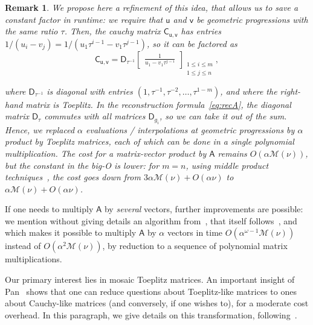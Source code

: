 \documentclass[sigconf]{acmart}
\newcommand{\vu}{\ensuremath{\mathsf{u}}}
\newcommand{\vv}{\ensuremath{\mathsf{v}}}
\newcommand{\mA}{\ensuremath{\mathsf{A}}}
\newcommand{\mC}{\ensuremath{\mathsf{C}}}
\newcommand{\mD}{\ensuremath{\mathsf{D}}}
\newcommand{\M}{\ensuremath{\mathscr{M}}}
\newcommand{\mx}{\ensuremath{\nu}}
\theoremstyle{acmdefinition}
\newtheorem{remark}[theorem]{Remark}
\begin{document}
\vspace{-2mm}

\begin{remark}\label{rmk:factor3}
We propose here a refinement of this idea, that allows us to
save a constant factor in runtime: we require that $\vu$ and $\vv$ be
geometric progressions with {\em the same ratio} $\tau$. Then, the
cauchy matrix $\mC_{\vu,\vv}$ has entries $1/(u_i -
v_j) = 1/(u_1 \tau^{i-1} - v_1 \tau^{j-1})$, so it can be factored as
\vspace{-3px}
$$
\mC_{\vu,\vv}=\mD_{\tau^{-1}}
\begin{bmatrix}
\frac{1}{u_1 - v_1 \tau^{j-i}}
\end{bmatrix}_{\substack{1 \leq i \leq m\\1 \leq j \leq n}},
$$

\vspace{-3px}
\noindent where $\mD_{\tau^{-1}}$ is diagonal with entries
$(1,\tau^{-1},\tau^{-2},\dots,\tau^{1-m})$, and where the right-hand matrix
is Toeplitz. In the reconstruction formula~\eqref{eq:recA}, the
diagonal matrix $\mD_\tau$ commutes with all matrices $\mD_{g_i}$, so
we can take it out of the sum. Hence, we replaced $\alpha$ evaluations
/ interpolations at geometric progressions by $\alpha$ product by
Toeplitz matrices, each of which can be done in a single polynomial
multiplication. The cost for a matrix-vector product by $\mA$ remains
$O(\alpha \M(\mx))$, but the constant in the big-O is lower: for $m=n$,
using middle product techniques~\cite{HaQuZi04,BoLeSc03}, the
cost goes down from $3\alpha \M(\mx) +O(\alpha \mx)$ to $\alpha \M(\mx)
+O(\alpha \mx)$. 
\end{remark}

If one needs to multiply $\mA$ by {\em several} vectors,
further improvements are possible: we mention without giving details
an algorithm from~\cite{BoJeMoSc16}, that itself
follows~\cite{BoJeSc08}, and which makes it possible to multiply $\mA$
by $\alpha$ vectors in time $O(\alpha^{\omega-1} \M(\mx))$ instead of
$O(\alpha^2 \M(\mx))$, by reduction to a sequence of polynomial matrix
multiplications.

\smallskip{}
Our primary interest lies in mosaic
Toep\-litz matrices. An important insight of Pan~\cite{Pan90} shows
that one can reduce questions about Toeplitz-like matrices to ones
about Cauchy-like matrices (and conversely, if one wishes to), for a
moderate cost overhead. In this paragraph, we give details on 
this transformation, following~\cite[Chapter~4.8]{Pan01}.
\end{document}
